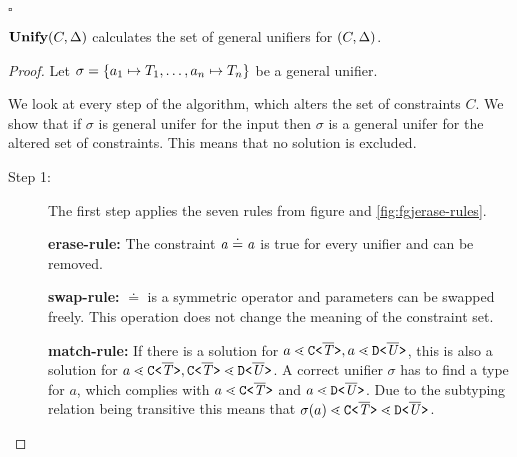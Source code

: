 \hfill $\square$


\begin{theorem}[Completeness]\label{theo:unifyCompleteness}
  $\textbf{Unify}{} (C, \Delta)$ calculates {the set} of general
  unifiers for $(C, \Delta)$. 
\end{theorem}

\begin{proof}

{Let $\sigma = \{ a_1 \mapsto T_1, \ldots , a_n \mapsto T_n \}$ be a general unifier.
  

We look at every step of the algorithm, which alters the set of constraints $C$.
We show that if $\sigma$ is general unifer for the input then $\sigma$ is a
general unifer for the altered set of constraints. This means that no solution
is excluded.}



\begin{description}
\item[Step 1:]
The first step applies the seven rules from figure
\red{\ref{fig:fgjreduce-rules}} and \ref{fig:fgjerase-rules}.

\textbf{erase-rule:} The constraint $\mathit{ a } \doteq \mathit{ a }$ is true for every unifier and can be removed.

\textbf{swap-rule:} $\doteq$ is a symmetric operator and parameters can be swapped freely.
This operation does not change the meaning of the constraint set.

\textbf{match-rule:}
If there is a solution for $a \lessdot \mathtt{C \texttt{<} \overline{\tt \mathit{T}} \texttt{>} }, a \lessdot \mathtt{D \texttt{<} \overline{\tt \mathit{U}} \texttt{>} }$,
this is also a solution for $a \lessdot \mathtt{C \texttt{<} \overline{\tt \mathit{T}} \texttt{>} }, \mathtt{C \texttt{<} \overline{\tt \mathit{T}} \texttt{>} } \lessdot \mathtt{D \texttt{<} \overline{\tt \mathit{U}} \texttt{>} }$.
A correct unifier $\sigma$ has to find a type for $a$, which complies with $a \lessdot \mathtt{C \texttt{<} \overline{\tt \mathit{T}} \texttt{>} }$ and $a \lessdot \mathtt{D \texttt{<} \overline{\tt \mathit{U}} \texttt{>} }$.
Due to the subtyping relation being transitive this means that $\sigma(a) \lessdot \mathtt{C \texttt{<} \overline{\tt \mathit{T}} \texttt{>} } \lessdot \mathtt{D \texttt{<} \overline{\tt \mathit{U}} \texttt{>} }$.


\end{description}
\end{proof}
